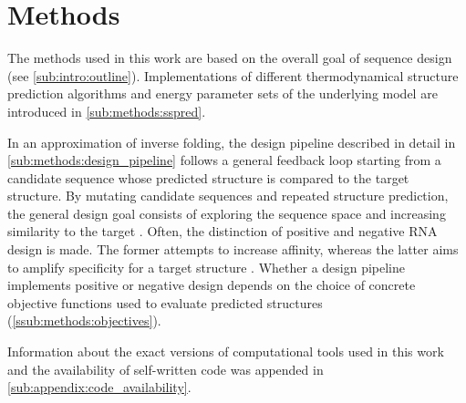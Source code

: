 \documentclass[../../master.tex]{subfiles}
\begin{document}
\section{Methods}
\label{sec:methods:methods}

The methods used in this work are based on the overall goal of sequence design (see \autoref{sub:intro:outline}).
Implementations of different thermodynamical structure prediction algorithms and energy parameter sets of the underlying model 
are introduced in \autoref{sub:methods:sspred}.

In an approximation of inverse folding, the design pipeline described in detail in \autoref{sub:methods:design_pipeline} follows a general feedback loop starting from a candidate sequence whose predicted structure is compared to the target structure. 
By mutating candidate sequences and repeated structure prediction, the general design goal consists of exploring the sequence space and increasing similarity to the target \parencite{dirks_paradigms_2004}.
Often, the distinction of positive and negative RNA design is made. 
The former attempts to increase affinity, whereas the latter aims to amplify specificity for a target structure \parencite{dirks_paradigms_2004}.
Whether a design pipeline implements positive or negative design depends on the choice of concrete objective functions used to evaluate predicted structures (\autoref{ssub:methods:objectives}).

Information about the exact versions of computational tools used in this work and the availability of self-written code was appended in \autoref{sub:appendix:code_availability}.
\end{document}
